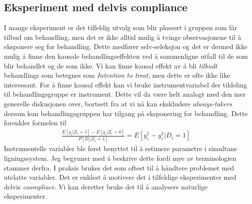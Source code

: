 \subsection{Eksperiment med delvis compliance}
I mange eksperiment er det tilfeldig utvalg som blir plassert i gruppen som får tilbud om behandling, men det er ikke alltid mulig å tvinge observasjonene til å eksponere seg for behandling. Dette medfører selv-seleksjon og det er dermed ikke mulig å finne den kausale behandlingseffekten ved å sammenligne utfall til de som blir behandlet og de som ikke. Vi kan finne kausal effekt av å bli \textit{tilbudt} behandlings som betegnes som \textit{Intention to treat}, men dette er ofte ikke like interessant. For å finne kausal effekt kan vi bruke instrumentvariabel der tildeling til behandlingsgruppe er instrument. Dette vil da være helt analogt med den mer generelle diskusjonen over, bortsett fra at vi nå kan ekskludere \textit{always-takers} dersom kun behandlingsgruppen har tilgang på eksponering for behandling. Dette forenkler formelen til
\begin{align}
\frac{E[y_i|Z_i=1]-E[y_i|Z_i=0]}{P[D_i|Z_i=1]} = E[y_i^1-y_i^1|D_i=1]
\end{align}
Instrumentelle variabler ble først benyttet til å estimere parametre i simultane ligningssystem. Jeg begynner med å beskrive dette fordi mye av terminologien stammer derfra. I praksis brukes det som oftest til å håndtere problemet med utelatte variabler. Det er enklest å motivere det i tilfeldige eksperimenter med delvis \textit{coompliace}. Vi kan deretter bruke det til å analysere naturlige eksperimenter.
